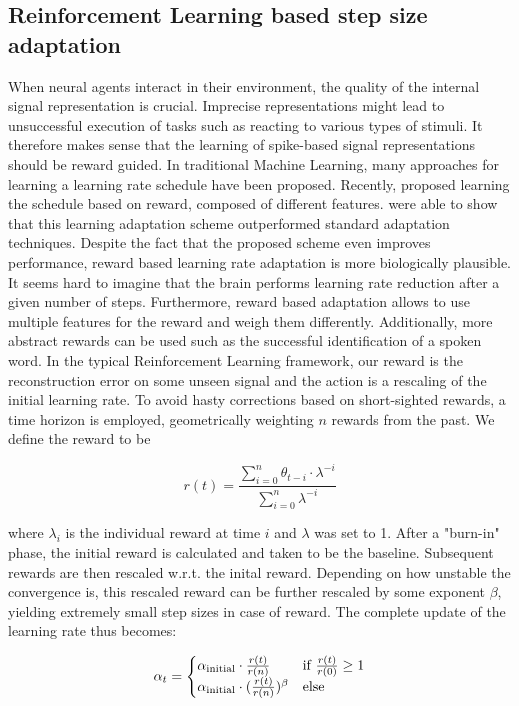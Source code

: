\documentclass[twoside,11pt]{article}
\begin{document}
\subsection{Reinforcement Learning based step size adaptation}
When neural agents interact in their environment, the quality of the internal signal representation
is crucial. Imprecise representations might lead to unsuccessful execution of tasks such as
reacting to various types of stimuli. It therefore makes sense that the learning of spike-based signal
representations should be reward guided. In traditional Machine Learning, many approaches for learning
a learning rate schedule have been proposed. Recently, \cite{xu2019learning} proposed learning the
schedule based on reward, composed of different features. \citet{xu2019learning} were able to show
that this learning adaptation scheme outperformed standard adaptation techniques.
Despite the fact that the proposed scheme even improves performance, reward based learning rate adaptation
is more biologically plausible. It seems hard to imagine that the brain performs learning rate reduction
after a given number of steps. Furthermore, reward based adaptation allows to use multiple features
for the reward and weigh them differently. Additionally, more abstract rewards can be used such as the
successful identification of a spoken word.
In the typical Reinforcement Learning framework, our reward is the reconstruction error on some unseen signal
and the action is a rescaling of the initial learning rate. To avoid hasty corrections based
on short-sighted rewards, a time horizon is employed, geometrically weighting $n$ rewards from the past.
We define the reward to be

\begin{equation*} \label{eq:reward}
    r(t) = \frac{\sum_{i=0}^{n}{\theta_{t-i} \cdot \lambda^{-i}}}{\sum_{i=0}^{n}{\lambda^{-i}}}
\end{equation*}

where $\lambda_i$ is the individual reward at time $i$ and $\lambda$ was set to 1.
After a "burn-in" phase, the initial reward is calculated and taken to be the baseline. Subsequent
rewards are then rescaled w.r.t. the inital reward. Depending on how unstable the convergence is,
this rescaled reward can be further rescaled by some exponent $\beta$, yielding extremely small step sizes in case of
reward.
The complete update of the learning rate thus becomes:

\begin{equation*}
  \alpha_{t} =
    \begin{cases}
      \alpha_{\textnormal{initial}} \cdot \frac{r(t)}{r(n)} & \text{if $\frac{r(t)}{r(0)} \geq 1$}\\
      \alpha_{\textnormal{initial}} \cdot (\frac{r(t)}{r(n)})^{\beta} & \text{else}
    \end{cases}
\end{equation*}
\end{document}
